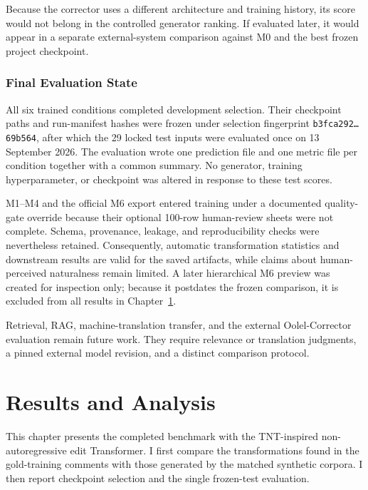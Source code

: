 \documentclass[12pt, a4paper, twoside, openany]{report}
\begin{document}
Because the corrector uses a different architecture and training history, its score would not belong in the controlled generator ranking. If evaluated later, it would appear in a separate external-system comparison against M0 and the best frozen project checkpoint.


\subsection{Final Evaluation State}

All six trained conditions completed development selection. Their checkpoint paths and run-manifest hashes were frozen under selection fingerprint \texttt{b3fca292\ldots 69b564}, after which the 29 locked test inputs were evaluated once on 13 September 2026. The evaluation wrote one prediction file and one metric file per condition together with a common summary. No generator, training hyperparameter, or checkpoint was altered in response to these test scores.

M1--M4 and the official M6 export entered training under a documented quality-gate override because their optional 100-row human-review sheets were not complete. Schema, provenance, leakage, and reproducibility checks were nevertheless retained. Consequently, automatic transformation statistics and downstream results are valid for the saved artifacts, while claims about human-perceived naturalness remain limited. A later hierarchical M6 preview was created for inspection only; because it postdates the frozen comparison, it is excluded from all results in Chapter~\ref{chap:results}.

Retrieval, RAG, machine-translation transfer, and the external Oolel-Corrector evaluation remain future work. They require relevance or translation judgments, a pinned external model revision, and a distinct comparison protocol.

\chapter{Results and Analysis}
\label{chap:results}

This chapter presents the completed benchmark with the TNT-inspired non-autoregressive edit Transformer. I first compare the transformations found in the gold-training comments with those generated by the matched synthetic corpora. I then report checkpoint selection and the single frozen-test evaluation.
\end{document}
